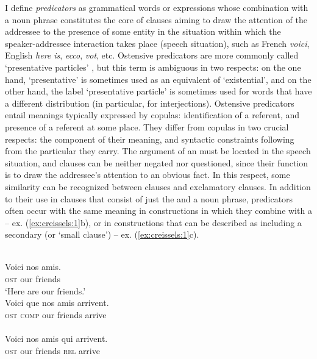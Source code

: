 \documentclass[output=paper]{langsci/langscibook}
\begin{document}
I define \textit{ predicators} as grammatical words or expressions whose combination with a noun phrase constitutes the core of clauses aiming to draw the attention of the addressee to the presence of some entity in the situation within which the speaker-addressee interaction takes place (speech situation), such as French \textit{voici}, English \textit{here is},  \textit{ecco},  \textit{vot}, etc. 
Ostensive predicators are more commonly called ‘presentative particles’ \citep{Petit2010}, but this term is ambiguous in two respects: on the one hand, ‘presentative’ is sometimes used as an equivalent of ‘existential’, and on the other hand, the label ‘presentative particle’ is sometimes used for words that have a different distribution (in particular, for interjections).
  Ostensive predicators entail meanings typically expressed by copulas: identification of a referent, and presence of a referent at some place. They differ from copulas in two crucial respects: the  component of their meaning, and syntactic constraints following from the particular  they carry. The argument of an   must be located in the speech situation, and  clauses can be neither negated nor questioned, since their function is to draw the addressee’s attention to an obvious fact. In this respect, some similarity can be recognized between  clauses and exclamatory clauses. 
  In addition to their use in clauses that consist of just the   and a noun phrase,  predicators often occur with the same  meaning in constructions in which they combine with a  – ex. (\ref{ex:creissels:1}b), or in constructions that can be described as including a secondary  (or ‘small clause’) – ex. (\ref{ex:creissels:1}c).

\ea%
    \label{ex:creissels:1}
    \\
   \ea
    \gll   Voici  nos  amis.\\
      \textsc{ost}  our  friends\\
      \glt  ‘Here are our friends.’\\
   \ex
    \gll   Voici  que  nos  amis  arrivent.\\
      \textsc{ost}  \textsc{comp}  our  friends  arrive\\
      \\
   \ex
    \gll   Voici  nos  amis  qui  arrivent.\\
      \textsc{ost}  our  friends  \textsc{rel}  arrive\\
\z
\z
\end{document}
